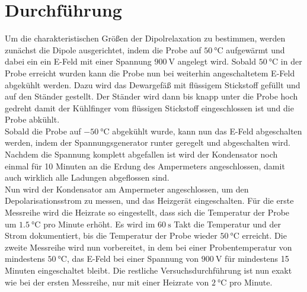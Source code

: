 \section{Durchführung}

    Um die charakteristischen Größen der Dipolrelaxation zu bestimmen, 
    werden zunächst die Dipole ausgerichtet, indem die Probe auf $\SI{50}{\celsius}$ aufgewärmt und dabei ein ein E-Feld mit einer Spannung $\SI{900}{\volt}$ angelegt wird.
    Sobald $\SI{50}{\celsius}$ in der Probe erreicht wurden kann die Probe nun bei weiterhin angeschaltetem E-Feld abgekühlt werden.
    Dazu wird das Dewargefäß mit flüssigem Stickstoff gefüllt und auf den Ständer gestellt.
    Der Ständer wird dann bis knapp unter die Probe hoch gedreht damit der Kühlfinger vom flüssigen Stickstoff eingeschlossen ist und die Probe abkühlt.\\
    Sobald die Probe auf $\SI{-50}{\celsius}$ abgekühlt wurde, kann nun das E-Feld abgeschalten werden, indem der Spannungsgenerator runter geregelt und abgeschalten wird.
    Nachdem die Spannung komplett abgefallen ist wird der Kondensator noch einmal für 10 Minuten an die Erdung des Ampermeters angeschlossen, damit auch wirklich alle Ladungen abgeflossen sind.\\
    Nun wird der Kondensator am Ampermeter angeschlossen, um den Depolarisationsstrom zu messen, und das Heizgerät eingeschalten.
    Für die erste Messreihe wird die Heizrate so eingestellt, dass sich die Temperatur der Probe um $\SI{1.5}{\celsius}$ pro Minute erhöht.
    Es wird im $\SI{60}{\second}$ Takt die Temperatur und der Strom dokumentiert, bis die Temperatur der Probe wieder $\SI{50}{\celsius}$ erreicht. 
    Die zweite Messreihe wird nun vorbereitet, in dem bei einer Probentemperatur von mindestens $\SI{50}{\celsius}$, das E-Feld bei einer Spannung von $\SI{900}{\volt}$ für mindestens 15 Minuten eingeschaltet bleibt.
    Die restliche Versuchsdurchführung ist nun exakt wie bei der ersten Messreihe, nur mit einer Heizrate von $\SI{2}{\celsius}$ pro Minute.
